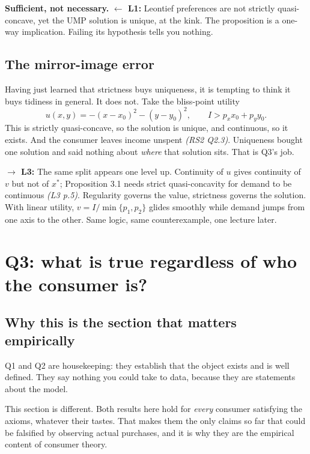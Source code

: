 \documentclass[11pt]{article}
\theoremstyle{definition}
\newenvironment{keybox}{\begin{snugshade}\noindent\ignorespaces}{\end{snugshade}}
\newcommand{\xs}{x^*}
\newcommand{\src}[1]{\textit{\small (#1)}}
\newcommand{\back}[1]{\textbf{\small $\leftarrow$ L1:} \small #1}
\newcommand{\fwd}[1]{\textbf{\small $\rightarrow$ L3:} \small #1}
\begin{document}
\vspace{4pt}
\noindent\textbf{Sufficient, not necessary.} \back{Leontief preferences are not strictly
quasi-concave, yet the UMP solution is unique, at the kink.} The proposition is a one-way
implication. Failing its hypothesis tells you nothing.

\subsection{The mirror-image error}

Having just learned that strictness buys uniqueness, it is tempting to think it buys
tidiness in general. It does not. Take the bliss-point utility
\[
u(x,y)=-(x-x_0)^2-(y-y_0)^2,\qquad I>p_xx_0+p_yy_0.
\]
This is strictly quasi-concave, so the solution is unique, and continuous, so it exists.
And the consumer leaves income unspent \src{RS2 Q2.3}. Uniqueness bought one solution and
said nothing about \emph{where} that solution sits. That is Q3's job.

\begin{keybox}
\fwd{The same split appears one level up. Continuity of $u$ gives continuity of $v$ but not
of $\xs$; Proposition 3.1 needs strict quasi-concavity for demand to be continuous \src{L3
p.5}. Regularity governs the value, strictness governs the solution. With linear utility,
$v=I/\min\{p_1,p_2\}$ glides smoothly while demand jumps from one axis to the other. Same
logic, same counterexample, one lecture later.}
\end{keybox}

\clearpage

\section{Q3: what is true regardless of who the consumer is?}

\subsection{Why this is the section that matters empirically}

Q1 and Q2 are housekeeping: they establish that the object exists and is well defined. They
say nothing you could take to data, because they are statements about the model.

This section is different. Both results here hold for \emph{every} consumer satisfying the
axioms, whatever their tastes. That makes them the only claims so far that could be
falsified by observing actual purchases, and it is why they are the empirical content of
consumer theory.
\end{document}
